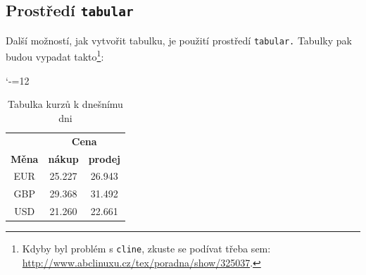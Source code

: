 \documentclass[a4paper, 11pt]{article}
\begin{document}
\subsection{Prostředí \texttt{tabular}}
Další možností, jak vytvořit tabulku, je použití prostředí \texttt{tabular.} Tabulky pak budou vypadat takto\footnote{Kdyby byl problém s \texttt{cline}, zkuste se podívat třeba sem: \hyperlink{http://www.abclinuxu.cz/tex/poradna/show/325037}{http://www.abclinuxu.cz/tex/poradna/show/325037}.}:

\vspace{1em}

\begin{table}[h!]
\catcode`-=12
\label{tabulka1}
    \begin{center}
        \begin{tabular}{|c|c|c|}
            \hline
            & \multicolumn{2}{|c|}{\textbf{Cena}} \\
            \cline{2-3}
            \textbf{Měna} & \textbf{nákup} & \textbf{prodej} \\
            \hline
            EUR & 25.227 & 26.943 \\
            GBP & 29.368 & 31.492 \\
            USD & 21.260 & 22.661 \\
            \hline
        \end{tabular}
    \caption{Tabulka kurzů k dnešnímu dni}
    \end{center}
\end{table}        
\end{document}
